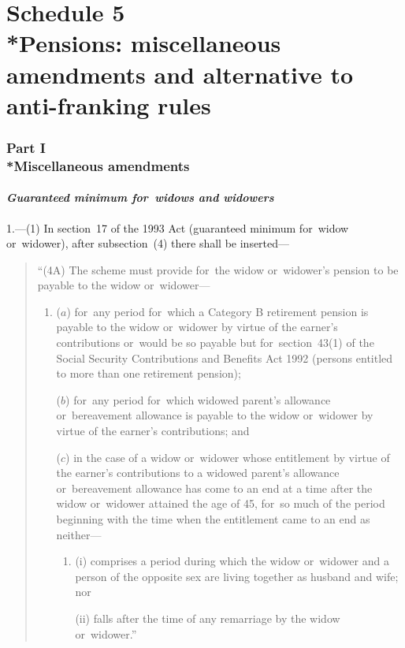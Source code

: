 \documentclass[12pt,a4paper]{article}
\begin{document}
\vfill

\part[Schedule 5 --- Pensions: miscellaneous amendments and alternative to anti-franking rules]{Schedule 5\\*Pensions: miscellaneous amendments and alternative to anti-franking rules}

\section[Part I --- Miscellaneous amendments]{Part I\\*Miscellaneous amendments}

\renewcommand\parthead{--- Schedule 5 Part I}

\subsection*{\itshape Guaranteed minimum for~widows and widowers}

1.---(1) In section~17 of the 1993 Act (guaranteed minimum for~widow or~widower), after subsection~(4)  there shall be inserted—
\begin{quotation}
“(4A) The scheme must provide for~the widow or~widower’s pension to be payable to the widow or~widower—
\begin{enumerate}\item[]
($a$) for~any period for~which a Category B retirement pension is payable to the widow or~widower by virtue of the earner’s contributions or~would be so payable but for~section~43(1)  of the Social Security Contributions and Benefits Act 1992 (persons entitled to more than one retirement pension);

($b$) for~any period for~which widowed parent’s allowance or~bereavement allowance is payable to the widow or~widower by virtue of the earner’s contributions; and

($c$) in the case of a widow or~widower whose entitlement by virtue of the earner’s contributions to a widowed parent’s allowance or~bereavement allowance has come to an end at a time after the widow or~widower attained the age of 45, for~so much of the period beginning with the time when the entitlement came to an end as neither—
\begin{enumerate}\item[]
(i) comprises a period during which the widow or~widower and a person of the opposite sex are living together as husband and wife; nor

(ii) falls after the time of any remarriage by the widow or~widower.”
\end{enumerate}
\end{enumerate}
\end{quotation}
\end{document}
